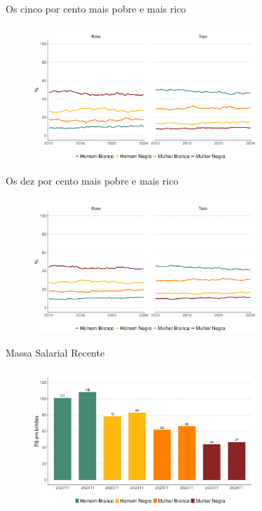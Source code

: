\documentclass[10pt, xcolor=x11names,compress]{beamer}
\begin{document}
	\begin{frame}{Os cinco por cento mais pobre e mais rico}
		\begin{figure}
			\centering
			\includegraphics[width = 0.75\textwidth]{figures_output/base_topo_5_linha.pdf}
		\end{figure}
	\end{frame}
	
	\begin{frame}{Os dez por cento mais pobre e mais rico}
		\begin{figure}
			\centering
			\includegraphics[width = 0.75\textwidth]{figures_output/base_topo_10_linha.pdf}
		\end{figure}
	\end{frame}
	
	\begin{frame}{Massa Salarial Recente}
		\begin{figure}
			\centering
			\includegraphics[width = 0.75\textwidth]{figures_output/massa_habitual.pdf}
		\end{figure}
	\end{frame}
	
\end{document}
